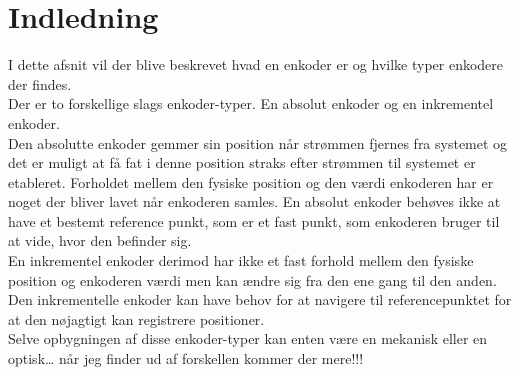 \chapter{Indledning}
\label{cha:indledning}
I dette afsnit vil der blive beskrevet hvad en enkoder er og hvilke typer enkodere der findes.\\[5mm]

Der er to forskellige slags enkoder-typer. En absolut enkoder og en inkrementel enkoder.\\[5mm]

Den absolutte enkoder gemmer sin position når strømmen fjernes fra systemet og det er muligt at få fat i denne position straks efter strømmen til systemet er etableret. Forholdet mellem den fysiske position og den værdi enkoderen har er noget der bliver lavet når enkoderen samles. En absolut enkoder behøves ikke at have et bestemt reference punkt, som er et fast punkt, som enkoderen bruger til at vide, hvor den befinder sig.\\[5mm] 

En inkrementel enkoder derimod har ikke et fast forhold mellem den fysiske position og enkoderen værdi men kan ændre sig fra den ene gang til den anden. Den inkrementelle enkoder kan have behov for at navigere til referencepunktet for at den nøjagtigt kan registrere positioner.\\[5mm]

Selve opbygningen af disse enkoder-typer kan enten være en mekanisk eller en optisk… når jeg finder ud af forskellen kommer der mere!!!

